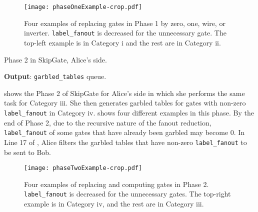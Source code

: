 \begin{figure}[h]
    \centering
    \texttt{[image: phaseOneExample-crop.pdf]}
    \caption{Four examples of replacing gates in Phase 1 by zero, one, wire, or inverter.
    \texttt{label\_fanout} is decreased for the unnecessary gate.
    The top-left example is in Category i and the rest are in Category ii.}
    \label{fig:phaseOneExample}
\end{figure}

\begin{algorithm}[]
\caption{Phase 2 in SkipGate, Alice's side.}\label{alg:phase2_alice}
\textbf{Output}: \texttt{garbled\_tables} queue.\\
\begin{algorithmic}[1]
		\ENDIF
	\ELSE {}
    \ENDIF
	\ENDIF
\ENDFOR
{}
\end{algorithmic}
\end{algorithm}

 shows the Phase 2 of SkipGate for Alice's side in which she performs the same task for Category iii.
She then generates garbled tables for gates with non-zero \texttt{label\_fanout} in Category iv.
 shows four different examples in this phase.
By the end of Phase 2, due to the recursive nature of the fanout reduction, \texttt{label\_fanout} of some gates that have already been garbled may become 0.
In Line 17 of , Alice filters the garbled tables that have non-zero \texttt{label\_fanout} to be sent to Bob.

\begin{figure}[h]
    \centering
    \texttt{[image: phaseTwoExample-crop.pdf]}
    \caption{Four examples of replacing and computing gates in Phase 2.
    		 \texttt{label\_fanout} is decreased for the unnecessary gates.
         The top-right example is in Category iv, and the rest are in Category iii.}
    \label{fig:phaseTwoExample}
\end{figure}

